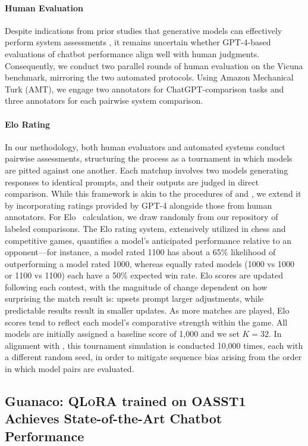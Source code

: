 \paragraph{Human Evaluation} Despite indications from prior studies that generative models can effectively perform system assessments \citep{fu2023gptscore}, it remains uncertain whether GPT-4-based evaluations of chatbot performance align well with human judgments. Consequently, we conduct two parallel rounds of human evaluation on the Vicuna benchmark, mirroring the two automated protocols. Using Amazon Mechanical Turk (AMT), we engage two annotators for ChatGPT-comparison tasks and three annotators for each pairwise system comparison.

\paragraph{Elo Rating} In our methodology, both human evaluators and automated systems conduct pairwise assessments, structuring the process as a tournament in which models are pitted against one another. Each matchup involves two models generating responses to identical prompts, and their outputs are judged in direct comparison. While this framework is akin to the procedures of \citet{bai2022training} and \citet{vicuna2023}, we extend it by incorporating ratings provided by GPT-4 alongside those from human annotators. For Elo~\citep{elo1967proposed,elo1978rating} calculation, we draw randomly from our repository of labeled comparisons. The Elo rating system, extensively utilized in chess and competitive games, quantifies a model's anticipated performance relative to an opponent—for instance, a model rated 1100 has about a 65\% likelihood of outperforming a model rated 1000, whereas equally rated models (1000 vs 1000 or 1100 vs 1100) each have a 50\% expected win rate. Elo scores are updated following each contest, with the magnitude of change dependent on how surprising the match result is: upsets prompt larger adjustments, while predictable results result in smaller updates. As more matches are played, Elo scores tend to reflect each model's comparative strength within the game. All models are initially assigned a baseline score of 1,000 and we set $K=32$. In alignment with \citet{vicuna2023}, this tournament simulation is conducted 10,000 times, each with a different random seed, in order to mitigate sequence bias arising from the order in which model pairs are evaluated.

\subsection{\textbf{Guanaco}: \textsc{QLoRA} trained on OASST1 Achieves State-of-the-Art Chatbot Performance}


